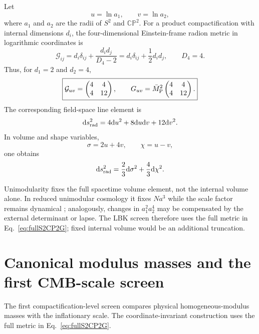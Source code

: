 \documentclass[11pt,a4paper]{article}
\newcommand{\Mpl}{\bar M_{\rm P}}
\newcommand{\dd}{\mathrm d}
\newcommand{\CP}{\mathbb{CP}}
\begin{document}
Let
\begin{equation}
 u=\ln a_1,\qquad v=\ln a_2,
\end{equation}
where $a_1$ and $a_2$ are the radii of $S^2$ and $\CP^2$. For a product compactification with internal dimensions $d_i$, the four-dimensional Einstein-frame radion metric in logarithmic coordinates is
\begin{equation}
\mathcal G_{ij}=d_i\delta_{ij}+\frac{d_i d_j}{D_4-2}
=d_i\delta_{ij}+\frac12 d_i d_j,
\qquad D_4=4 .
\label{eq:generalradionmetric}
\end{equation}
Thus, for $d_1=2$ and $d_2=4$,
\begin{equation}
\boxed{
\mathcal G_{uv}=\begin{pmatrix}4&4\\4&12\end{pmatrix},
\qquad
G_{uv}=\Mpl^2\begin{pmatrix}4&4\\4&12\end{pmatrix}.
}
\label{eq:fullS2CP2G}
\end{equation}
The corresponding field-space line element is
\begin{equation}
\dd s_{\rm rad}^2=4\dd u^2+8\dd u\dd v+12\dd v^2.
\end{equation}
In volume and shape variables,
\begin{equation}
\sigma=2u+4v,\qquad \chi=u-v,
\end{equation}
one obtains
\begin{equation}
\dd s_{\rm rad}^2=\frac23\dd\sigma^2+\frac43\dd\chi^2.
\label{eq:diagvolshape}
\end{equation}

Unimodularity fixes the full spacetime volume element, not the internal volume alone. In reduced unimodular cosmology it fixes $Na^3$ while the scale factor remains dynamical \cite{Yamashita2026UnimodularQC}; analogously, changes in $a_1^2a_2^4$ may be compensated by the external determinant or lapse. The LBK screen therefore uses the full metric in Eq.~\eqref{eq:fullS2CP2G}; fixed internal volume would be an additional truncation.

\section{Canonical modulus masses and the first CMB-scale screen}
\label{app:canonicalmassscreen}
The first compactification-level screen compares physical homogeneous-modulus masses with the inflationary scale. The coordinate-invariant construction uses the full metric in Eq.~\eqref{eq:fullS2CP2G}.
\end{document}
